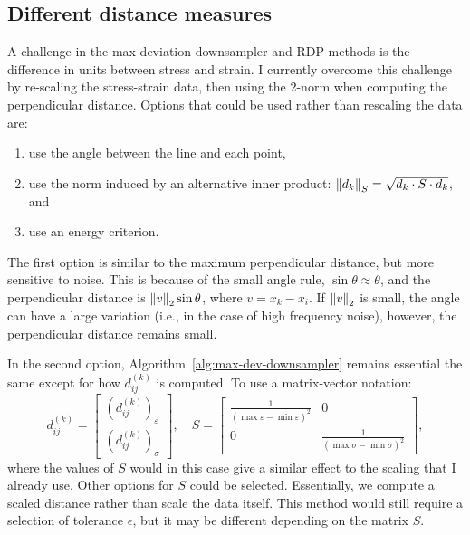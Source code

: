 \documentclass[a4paper,11pt]{article}
\begin{document}
\subsection{Different distance measures}

A challenge in the max deviation downsampler and RDP methods is the difference in units between stress and strain.
I currently overcome this challenge by re-scaling the stress-strain data, then using the 2-norm when computing the perpendicular distance.
Options that could be used rather than rescaling the data are:
\begin{enumerate}
    \item use the angle between the line and each point,
    \item use the norm induced by an alternative inner product: $\norm{d_k}_S = \sqrt{d_k \cdot S \cdot d_k}$, and
    \item use an energy criterion.
\end{enumerate}

The first option is similar to the maximum perpendicular distance, but more sensitive to noise.
This is because of the small angle rule, $\sin \theta \approx \theta$, and the perpendicular distance is $\norm{v}_2 \sin \theta$, where $v = x_k - x_i$.
If $\norm{v}_2$ is small, the angle can have a large variation (i.e., in the case of high frequency noise), however, the perpendicular distance remains small.

In the second option, Algorithm~\ref{alg:max-dev-downsampler} remains essential the same except for how $d^{(k)}_{ij}$ is computed.
To use a matrix-vector notation:
\begin{equation*}
    d^{(k)}_{ij} = \begin{bmatrix}
        (d^{(k)}_{ij})_{\varepsilon} \\
        (d^{(k)}_{ij})_{\sigma}
    \end{bmatrix}, \quad
    S = \begin{bmatrix}
        \frac{1}{(\max \varepsilon - \min \varepsilon)^2} & 0 \\
        0 & \frac{1}{(\max \sigma - \min \sigma)^2}
    \end{bmatrix},
\end{equation*}
where the values of $S$ would in this case give a similar effect to the scaling that I already use.
Other options for $S$ could be selected.
Essentially, we compute a scaled distance rather than scale the data itself.
This method would still require a selection of tolerance $\epsilon$, but it may be different depending on the matrix $S$.
\end{document}
